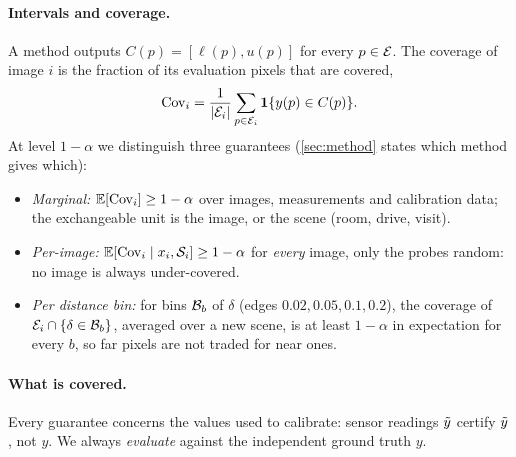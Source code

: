 \paragraph{Intervals and coverage.}
A method outputs $C(p)=[\ell(p),u(p)]$ for every $p\in\mathcal{E}$.
The coverage of image $i$ is the fraction of its evaluation pixels that are covered,
\begin{equation}
\mathrm{Cov}_i=\frac{1}{|\mathcal{E}_i|}\sum_{p\in\mathcal{E}_i}\mathbf{1}\{y(p)\in C(p)\}.
\label{eq:cov}
\end{equation}
At level $1-\alpha$ we distinguish three guarantees (\cref{sec:method} states which method gives which):
\begin{itemize}[leftmargin=*,itemsep=1pt,topsep=2pt]
\item \emph{Marginal:} $\mathbb{E}[\mathrm{Cov}_i]\ge 1-\alpha$ over images, measurements and calibration data; the exchangeable unit is the image, or the scene (room, drive, visit).
\item \emph{Per-image:} $\mathbb{E}[\mathrm{Cov}_i\mid x_i,\mathcal{S}_i]\ge 1-\alpha$ for \emph{every} image, only the probes random: no image is always under-covered.
\item \emph{Per distance bin:} for bins $\mathcal{B}_b$ of $\delta$ (edges $0.02,0.05,0.1,0.2$), the coverage of $\mathcal{E}_i\cap\{\delta\in\mathcal{B}_b\}$, averaged over a new scene, is at least $1-\alpha$ in expectation for every $b$, so far pixels are not traded for near ones.
\end{itemize}

\paragraph{What is covered.}
Every guarantee concerns the values used to calibrate: sensor readings $\tilde{y}$ certify $\tilde{y}$, not $y$. We always \emph{evaluate} against the independent ground truth $y$.
